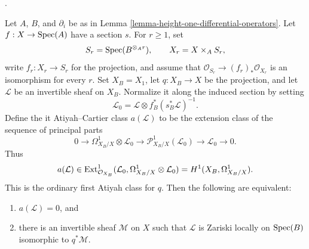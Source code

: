 \begin{proposition}
\label{proposition-atiyah-cartier-invertible}
\begin{reference}
\cite[Expos\'e 190, n\textsuperscript{o} 4, p. 323]{FGA}.
\end{reference}
Let $A$, $B$, and $\partial_i$ be as in
Lemma \ref{lemma-height-one-differential-operators}. Let
$f : X \to \mathop{\mathrm{Spec}}(A)$ have a section $s$. For $r \geq 1$, set
$$
S_r = \mathop{\mathrm{Spec}}(B^{\otimes_A r}),
\qquad X_r = X \times_A S_r,
$$
write $f_r : X_r \to S_r$ for the projection, and assume that
$\mathcal{O}_{S_r} \to (f_r)_*\mathcal{O}_{X_r}$ is an
isomorphism for every $r$. Set $X_B = X_1$, let $q : X_B \to X$ be the
projection, and let $\mathcal{L}$ be an invertible sheaf on $X_B$.
Normalize it along the induced section by setting
$$
\mathcal{L}_0 =
\mathcal{L} \otimes f_B^*(s_B^*\mathcal{L})^{-1}.
$$
Define the {it Atiyah--Cartier class} $a(\mathcal{L})$ to be the extension
class of the sequence of principal parts
$$
0 \longrightarrow
\Omega^1_{X_B/X} \otimes \mathcal{L}_0 \longrightarrow
\mathcal{P}^1_{X_B/X}(\mathcal{L}_0) \longrightarrow
\mathcal{L}_0 \longrightarrow 0.
$$
Thus
$$
a(\mathcal{L}) \in
\mathop{\mathrm{Ext}}\nolimits^1_{\mathcal{O}_{X_B}}
(\mathcal{L}_0, \Omega^1_{X_B/X} \otimes \mathcal{L}_0)
= H^1(X_B, \Omega^1_{X_B/X}).
$$
This is the ordinary first Atiyah class for $q$.
Then the following are equivalent:
\begin{enumerate}
\item $a(\mathcal{L}) = 0$, and
\item there is an invertible sheaf $\mathcal{M}$ on $X$ such that
$\mathcal{L}$ is Zariski locally on $\mathop{\mathrm{Spec}}(B)$ isomorphic to $q^*\mathcal{M}$.
\end{enumerate}
\end{proposition}

